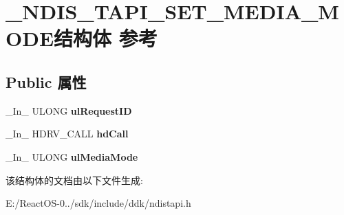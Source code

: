 \hypertarget{struct___n_d_i_s___t_a_p_i___s_e_t___m_e_d_i_a___m_o_d_e}{}\section{\+\_\+\+N\+D\+I\+S\+\_\+\+T\+A\+P\+I\+\_\+\+S\+E\+T\+\_\+\+M\+E\+D\+I\+A\+\_\+\+M\+O\+D\+E结构体 参考}
\label{struct___n_d_i_s___t_a_p_i___s_e_t___m_e_d_i_a___m_o_d_e}
\subsection*{Public 属性}
\begin{DoxyCompactItemize}
\item 
\mbox{\label{struct___n_d_i_s___t_a_p_i___s_e_t___m_e_d_i_a___m_o_d_e_a329145eef5ef231217a0c029398ff8ea}} 
\+\_\+\+In\+\_\+ U\+L\+O\+NG {\bfseries ul\+Request\+ID}
\item 
\mbox{\label{struct___n_d_i_s___t_a_p_i___s_e_t___m_e_d_i_a___m_o_d_e_ae83e51bb9b8abf954627e842f6963767}} 
\+\_\+\+In\+\_\+ H\+D\+R\+V\+\_\+\+C\+A\+LL {\bfseries hd\+Call}
\item 
\mbox{\label{struct___n_d_i_s___t_a_p_i___s_e_t___m_e_d_i_a___m_o_d_e_a49cae7a92e6287f67cffeff9de5993f0}} 
\+\_\+\+In\+\_\+ U\+L\+O\+NG {\bfseries ul\+Media\+Mode}
\end{DoxyCompactItemize}


该结构体的文档由以下文件生成\+:\begin{DoxyCompactItemize}
\item 
E\+:/\+React\+O\+S-\/0../sdk/include/ddk/ndistapi.\+h\end{DoxyCompactItemize}
